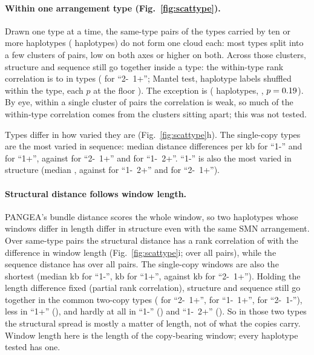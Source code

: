\paragraph{Within one arrangement type (Fig.~\ref{fig:scattype}).} Drawn one type at a time, the same-type pairs of
the \stTypes{} types carried by ten or more haplotypes (\stTypeHaps{} haplotypes) do not form one cloud each: most
types split into a few clusters of pairs, low on both axes or higher on both. Across those clusters, structure and
sequence still go together inside a type: the within-type rank correlation is \stRlo{} to \stRhi{} in \stSigTypes{}
types (\stRbig{} for ``2-~1+''; Mantel test, haplotype labels shuffled within the type, each $p$ at the floor
\mantelP{}). The exception is \stNsType{} (\stNsN{} haplotypes, \stNsR{}, $p = 0.19{}$). By eye, within a single
cluster of pairs the correlation is weak, so much of the within-type correlation comes from the clusters sitting apart;
this was not tested.

Types differ in how varied they are (Fig.~\ref{fig:scattype}h). The single-copy types are the most varied in
sequence: median distance \stQOne{} differences per kb for ``1-'' and \stQPlus{} for ``1+'', against \stQBig{} for
``2-~1+'' and \stQMix{} for ``1-~2+''. ``1-'' is also the most varied in structure (median \stSOne{}, against
\stSMix{} for ``1-~2+'' and \stSBig{} for ``2-~1+'').

\paragraph{Structural distance follows window length.} PANGEA's bundle distance scores the whole window, so two
haplotypes whose windows differ in length differ in structure even with the same SMN arrangement. Over same-type pairs
the structural distance has a rank correlation of \stLenSame{} with the difference in window length
(Fig.~\ref{fig:scattype}i; \stLenAll{} over all pairs), while the sequence distance has \stLenSeqAll{} over all pairs.
The single-copy windows are also the shortest (median \stLOne{} kb for ``1-'', \stLPlus{} kb for ``1+'', against
\stLBig{} kb for ``2-~1+''). Holding the length difference fixed (partial rank correlation), structure and sequence still
go together in the common two-copy types (\stPBig{} for ``2-~1+'', \stPInv{} for ``1-~1+'', \stPFlip{} for ``2-~1-''),
less in ``1+'' (\stPPlus{}), and hardly at all in ``1-'' (\stPOne{}) and ``1-~2+'' (\stPMix{}). So in those two types
the structural spread is mostly a matter of length, not of what the copies carry. Window length here is the length of
the copy-bearing window; every haplotype tested has one.

